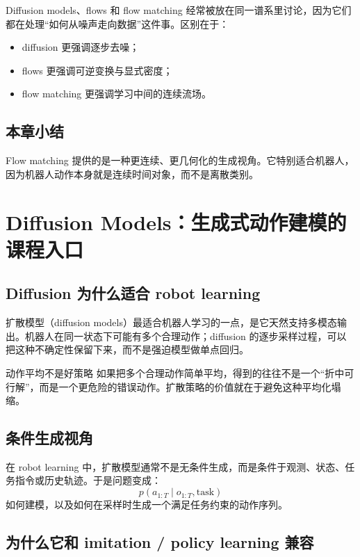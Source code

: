 \documentclass[a4paper]{article}
\begin{document}
Diffusion models、flows 和 flow matching 经常被放在同一谱系里讨论，因为它们都在处理“如何从噪声走向数据”这件事。区别在于：
\begin{itemize}
  \item diffusion 更强调逐步去噪；
  \item flows 更强调可逆变换与显式密度；
  \item flow matching 更强调学习中间的连续流场。
\end{itemize}

\subsection{本章小结}

Flow matching 提供的是一种更连续、更几何化的生成视角。它特别适合机器人，因为机器人动作本身就是连续时间对象，而不是离散类别。

\section{Diffusion Models：生成式动作建模的课程入口}

\subsection{Diffusion 为什么适合 robot learning}

扩散模型（diffusion models）最适合机器人学习的一点，是它天然支持多模态输出。机器人在同一状态下可能有多个合理动作；diffusion 的逐步采样过程，可以把这种不确定性保留下来，而不是强迫模型做单点回归。

\begin{importantbox}{动作平均不是好策略}
如果把多个合理动作简单平均，得到的往往不是一个“折中可行解”，而是一个更危险的错误动作。扩散策略的价值就在于避免这种平均化塌缩。
\end{importantbox}

\subsection{条件生成视角}

在 robot learning 中，扩散模型通常不是无条件生成，而是条件于观测、状态、任务指令或历史轨迹。于是问题变成：
\[
p(a_{1:T} \mid o_{1:T}, \text{task})
\]
如何建模，以及如何在采样时生成一个满足任务约束的动作序列。

\subsection{为什么它和 imitation / policy learning 兼容}
\end{document}
